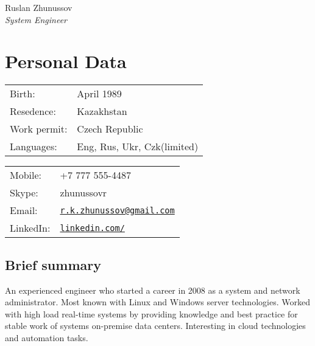 \documentclass[a4paper,10pt]{article}
\def\name{Ruslan Zhunussov}
\begin{document}
{\huge \name \\}
\textit{System Engineer}

\section*{Personal Data}
\begin{minipage}{0.45\linewidth}
    \begin{tabular}{ll}
        Birth: &  April 1989\\
        Resedence: &  Kazakhstan \\
        Work permit: & Czech Republic \\
        Languages: & Eng, Rus, Ukr, Czk(limited) \\
      \end{tabular}
\end{minipage}
\begin{minipage}{0.45\linewidth}
    \begin{tabular}{ll}
      Mobile: & +7 777 555-4487 \\
      Skype: &  zhunussovr \\
      Email: & \href{mailto:r.k.zhunussov@gmail.com}{\tt r.k.zhunussov@gmail.com} \\
      LinkedIn: & \href{https://www.linkedin.com/in/ruslan-zhunussov-6b575a5a}{\tt linkedin.com/} \\
    \end{tabular}
\end{minipage}

\subsection*{Brief summary}
\textnormal{An experienced engineer who started a career in 2008 as a system and network administrator.  
Most known with Linux and Windows server technologies. Worked with high load real-time systems by providing 
knowledge and best practice for stable work of systems on-premise data centers. Interesting in cloud technologies and automation tasks.  
}
\end{document}
